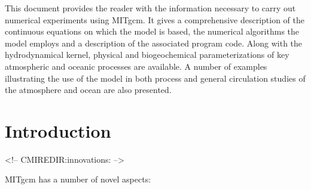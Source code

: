 








This document provides the reader with the information necessary to
carry out numerical experiments using MITgcm. It gives a comprehensive
description of the continuous equations on which the model is based, the
numerical algorithms the model employs and a description of the associated
program code. Along with the hydrodynamical kernel, physical and
biogeochemical parameterizations of key atmospheric and oceanic processes
are available. A number of examples illustrating the use of the model in
both process and general circulation studies of the atmosphere and ocean are
also presented.

\section{Introduction}
\begin{rawhtml}
<!-- CMIREDIR:innovations: -->
\end{rawhtml}


MITgcm has a number of novel aspects:

